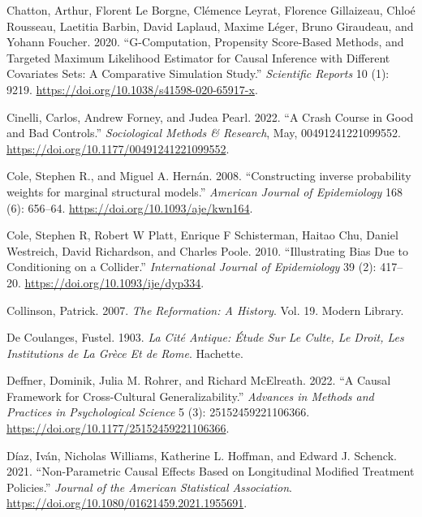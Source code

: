 \documentclass[
  singlecolumn]{article}
\newlength{\cslhangindent}
\newlength{\cslentryspacingunit} %
\newenvironment{CSLReferences}[2] %
 {%
  \setlength{\parindent}{0pt}
  \ifodd #1
  \let\oldpar\par
  \def\par{\hangindent=\cslhangindent\oldpar}
  \fi
  \setlength{\parskip}{#2\cslentryspacingunit}
 }%
 {}
\begin{document}
\begin{CSLReferences}{1}{0}
\leavevmode{}%
Chatton, Arthur, Florent Le Borgne, Clémence Leyrat, Florence
Gillaizeau, Chloé Rousseau, Laetitia Barbin, David Laplaud, Maxime
Léger, Bruno Giraudeau, and Yohann Foucher. 2020. {``G-Computation,
Propensity Score-Based Methods, and Targeted Maximum Likelihood
Estimator for Causal Inference with Different Covariates Sets: A
Comparative Simulation Study.''} \emph{Scientific Reports} 10 (1): 9219.
\url{https://doi.org/10.1038/s41598-020-65917-x}.

\leavevmode{}%
Cinelli, Carlos, Andrew Forney, and Judea Pearl. 2022. {``A Crash Course
in Good and Bad Controls.''} \emph{Sociological Methods \& Research},
May, 00491241221099552. \url{https://doi.org/10.1177/00491241221099552}.

\leavevmode{}%
Cole, Stephen R., and Miguel A. Hernán. 2008. {``Constructing inverse
probability weights for marginal structural models.''} \emph{American
Journal of Epidemiology} 168 (6): 656--64.
\url{https://doi.org/10.1093/aje/kwn164}.

\leavevmode{}%
Cole, Stephen R, Robert W Platt, Enrique F Schisterman, Haitao Chu,
Daniel Westreich, David Richardson, and Charles Poole. 2010.
{``Illustrating Bias Due to Conditioning on a Collider.''}
\emph{International Journal of Epidemiology} 39 (2): 417--20.
\url{https://doi.org/10.1093/ije/dyp334}.

\leavevmode{}%
Collinson, Patrick. 2007. \emph{The Reformation: A History}. Vol. 19.
Modern Library.

\leavevmode{}%
De Coulanges, Fustel. 1903. \emph{La Cité Antique: Étude Sur Le Culte,
Le Droit, Les Institutions de La Grèce Et de Rome}. Hachette.

\leavevmode{}%
Deffner, Dominik, Julia M. Rohrer, and Richard McElreath. 2022. {``A
Causal Framework for Cross-Cultural Generalizability.''} \emph{Advances
in Methods and Practices in Psychological Science} 5 (3):
25152459221106366. \url{https://doi.org/10.1177/25152459221106366}.

\leavevmode{}%
Díaz, Iván, Nicholas Williams, Katherine L. Hoffman, and Edward J.
Schenck. 2021. {``Non-Parametric Causal Effects Based on Longitudinal
Modified Treatment Policies.''} \emph{Journal of the American
Statistical Association}.
\url{https://doi.org/10.1080/01621459.2021.1955691}.


\end{CSLReferences}
\end{document}
